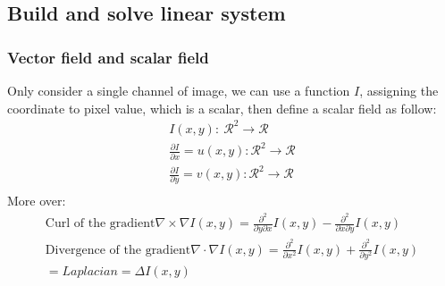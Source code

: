 \documentclass[letterpaper,12pt]{article}
\begin{document}
\subsection{Build and solve linear system}
\subsubsection{Vector field and scalar field}
Only consider a single channel of image, we can use a function $I$, assigning the coordinate to pixel value, which is a scalar, then define a scalar field as follow:  
\begin{equation*}
\begin{aligned}
I(x,y):\ \mathcal{R}^2 \rightarrow \mathcal{R}\\
\frac{\partial I}{\partial x} = u(x,y):\mathcal{R}^2 \rightarrow \mathcal{R} \\
\frac{\partial I}{\partial y} = v(x,y):\mathcal{R}^2 \rightarrow \mathcal{R} \\
\end{aligned}
\end{equation*}
More over:
\begin{equation*}
\begin{aligned}
\text{Curl of the gradient} \nabla \times \nabla I(x,y) = \frac{\partial^2}{\partial y \partial x}I(x,y)-\frac{\partial^2}{\partial x \partial y}I(x,y) \\
\text{Divergence of the gradient}  \nabla \cdot \nabla I(x,y) = \frac{\partial^2}{\partial x^2}I(x,y)+\frac{\partial^2}{\partial y^2}I(x,y) \\
= Laplacian = \Delta I(x,y)
\end{aligned}
\end{equation*}
\end{document}
